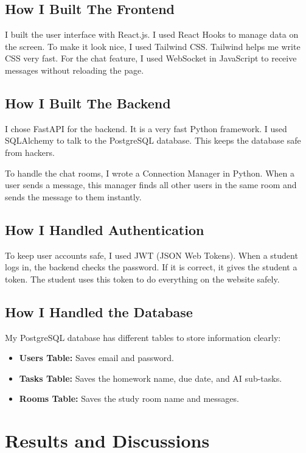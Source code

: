 \documentclass[12pt,a4paper]{report}
\begin{document}
\section{How I Built The Frontend}
I built the user interface with React.js. I used React Hooks to manage data on the screen. To make it look nice, I used Tailwind CSS. Tailwind helps me write CSS very fast. For the chat feature, I used WebSocket in JavaScript to receive messages without reloading the page.

\section{How I Built The Backend}
I chose FastAPI for the backend. It is a very fast Python framework. I used SQLAlchemy to talk to the PostgreSQL database. This keeps the database safe from hackers. 

To handle the chat rooms, I wrote a Connection Manager in Python. When a user sends a message, this manager finds all other users in the same room and sends the message to them instantly.

\section{How I Handled Authentication}
To keep user accounts safe, I used JWT (JSON Web Tokens). When a student logs in, the backend checks the password. If it is correct, it gives the student a token. The student uses this token to do everything on the website safely.

\section{How I Handled the Database}
My PostgreSQL database has different tables to store information clearly:
\begin{itemize}
    \item \textbf{Users Table:} Saves email and password.
    \item \textbf{Tasks Table:} Saves the homework name, due date, and AI sub-tasks.
    \item \textbf{Rooms Table:} Saves the study room name and messages.
\end{itemize}

\chapter{Results and Discussions}
\end{document}
